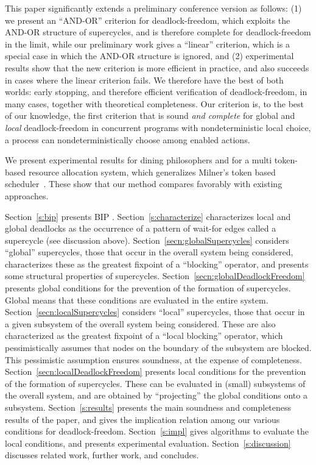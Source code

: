 This paper significantly extends a preliminary conference version \cite{FORTE13} as
follows: 
(1) we present an ``AND-OR'' criterion for deadlock-freedom, which exploits the AND-OR structure of supercycles, and is therefore complete for
deadlock-freedom in the limit, while our preliminary work \cite{FORTE13} gives a ``linear'' criterion, which is a special case in which the AND-OR structure is ignored, and
(2) experimental results show that the new criterion is more efficient
in practice, and also succeeds in cases where the linear criterion
fails.
We therefore have the best of both worlds: early stopping, and
therefore efficient verification of deadlock-freedom, in many cases,
together with theoretical completeness.
%
Our criterion is, to the best of our knowledge, the first criterion that is sound \emph{and complete} 
for global and \emph{local} deadlock-freedom in
concurrent programs with nondeterministic local choice, \ie a process can nondeterministically choose among enabled actions.

We present experimental results for dining philosophers and for a multi token-based resource allocation system, which generalizes Milner's token based
scheduler~\cite{milner}.  These show that our method compares favorably with existing approaches.



Section~\ref{s:bip} presents BIP \cite{BliudzeS08}.  Section~\ref{s:characterize} characterizes local and global deadlocks as the occurrence of a pattern of wait-for
edges called a supercycle (see discussion above).   Section~\ref{secn:globalSupercycles} considers ``global''
supercycles, \ie those that occur in the overall system being considered, characterizes these as the greatest fixpoint of a ``blocking'' operator, and
presents some structural properties of supercycles. Section~\ref{secn:globalDeadlockFreedom} presents global conditions for the prevention of the
formation of supercycles. Global means that these conditions are evaluated in the entire system.  Section~\ref{secn:localSupercycles} considers
``local'' supercycles, \ie those that occur in a given subsystem of the overall system being considered.  These are also characterized as the greatest
fixpoint of a ``local blocking'' operator, which pessimistically assumes that nodes on the boundary of the subsystem are blocked. This pessimistic
assumption ensures soundness, at the expense of completeness.  Section~\ref{secn:localDeadlockFreedom} presents local conditions for the prevention of
the formation of supercycles. These can be evaluated in (small) subsystems of the overall system, and are obtained by ``projecting'' the global
conditions onto a subsystem.  Section~\ref{s:results} presents the main soundness and completeness results of the paper, and gives the implication
relation among our various conditions for deadlock-freedom.  Section~\ref{s:impl} gives algorithms to evaluate the local conditions, and presents
experimental evaluation.  Section~\ref{s:discussion} discusses related work, further work, and concludes.
